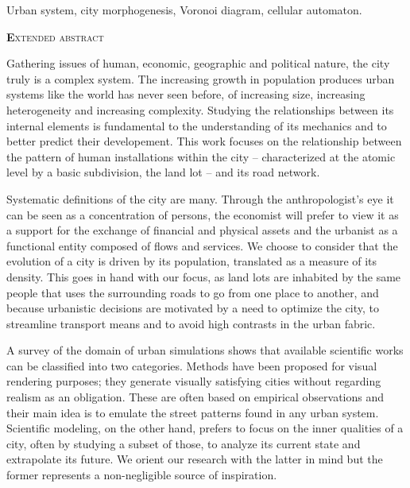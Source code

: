 \documentclass[12pt]{article}
\begin{document}
{Urban system, city morphogenesis, Voronoi diagram, cellular automaton.}

\begin{center}
  {\scshape\textbf Extended abstract}
\end{center}

Gathering issues of human, economic, geographic and political nature,
the city truly is a complex system. The increasing growth in
population produces urban systems like the world has never seen
before, of increasing size, increasing heterogeneity and increasing
complexity. Studying the relationships between its internal elements
is fundamental to the understanding of its mechanics and to better
predict their developement. This work focuses on the relationship
between the pattern of human installations within the city --
characterized at the atomic level by a basic subdivision, the land lot
-- and its road network.

Systematic definitions of the city are many. Through the
anthropologist's eye it can be seen as a concentration of persons, the
economist will prefer to view it as a support for the exchange of
financial and physical assets and the urbanist as a functional entity
composed of flows and services. We choose to consider that the
evolution of a city is driven by its population, translated as a
measure of its density. This goes in hand with our focus, as land lots
are inhabited by the same people that uses the surrounding roads to go
from one place to another, and because urbanistic decisions are
motivated by a need to optimize the city, to streamline transport
means and to avoid high contrasts in the urban fabric.

A survey of the domain of urban simulations shows that available
scientific works can be classified into two categories. Methods have
been proposed for visual rendering purposes; they generate visually
satisfying cities without regarding realism as an obligation. These
are often based on empirical observations and their main idea is to
emulate the street patterns found in any urban system. Scientific
modeling, on the other hand, prefers to focus on the inner qualities
of a city, often by studying a subset of those, to analyze its current
state and extrapolate its future. We orient our research with the
latter in mind but the former represents a non-negligible source of
inspiration.
\end{document}
